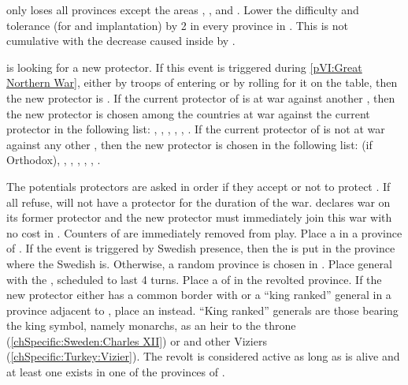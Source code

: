 \phevnt
\aparag \paysmogol only loses all provinces except the areas
\granderegionDelhi, \granderegionAoudh, \granderegionBengale and
\granderegionGondwana.
\aparag Lower the difficulty and tolerance (for \COL and \TP implantation) by
2 in every province in \continentIndia.
\bparag This is not cumulative with the decrease caused inside \paysmogol by
.





\condition{}
\aparag \paysukraine is looking for a new protector.
\bparag If this event is triggered during \ref{pVI:Great Northern War}, either
by troops of \SUE entering \regionUkraine or by rolling for it on the table,
then the new protector is \SUE.
\bparag If the current protector of \paysukraine is at war against another
\MAJ, then the new protector is chosen among the countries at war against the
current protector in the following list: \RUS, \POL, \TUR, \AUS, \SUE, \PRU.
\bparag If the current protector of \paysukraine is not at war against any
other \MAJ, then the new protector is chosen in the following list: \POL (if
Orthodox), \RUS, \TUR, \POL, \AUS, \SUE, \PRU.

\phevnt
\aparag The potentials protectors are asked in order if they accept or not to
protect \paysukraine.
\bparag If all refuse, \paysukraine will not have a protector for the duration
of the war.
\aparag \paysukraine declares war on its former protector and the new
protector must immediately join this war with no cost in \STAB.
\aparag Counters of \paysukraine are immediately removed from play.
\aparag Place a \REVOLT \faceplus in a province of \regionUkraine.
\bparag If the event is triggered by Swedish presence, then the \REVOLT is put
in the province where the Swedish \ARMY is. Otherwise, a random province is
chosen in \paysukraine.
\aparag Place general  with the \REVOLT, scheduled to
last 4 turns.
\aparag Place a \LD of \paysukraine in the revolted province.
\bparag If the new protector either has a common border with \paysukraine or a
``king ranked'' general in a province adjacent to \paysukraine, place an
\ARMY\facemoins instead.
\bparag ``King ranked'' generals are those bearing the king symbol, namely
monarchs,  as an heir to the throne
(\ref{chSpecific:Sweden:Charles XII}) or  and other Viziers
(\ref{chSpecific:Turkey:Vizier}).
\aparag The revolt is considered active as long as \leaderMazepa is alive and
at least one \REVOLT exists in one of the provinces of \regionUkraine.


